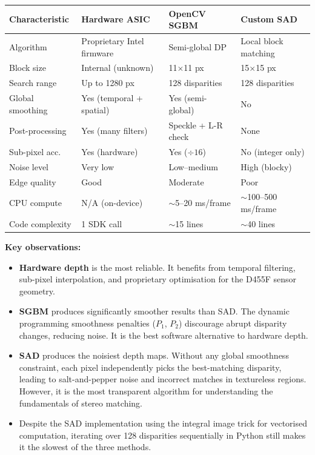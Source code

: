 \documentclass[12pt, a4paper]{article}
\begin{document}
\begin{center}
\begin{tabularx}{\linewidth}{lXXX}
  \toprule
  \textbf{Characteristic}   & \textbf{Hardware ASIC} & \textbf{OpenCV SGBM} & \textbf{Custom SAD} \\
  \midrule
  Algorithm       & Proprietary Intel firmware & Semi-global DP & Local block matching \\
  Block size      & Internal (unknown)  & 11$\times$11 px & 15$\times$15 px \\
  Search range    & Up to 1280 px       & 128 disparities & 128 disparities \\
  Global smoothing& Yes (temporal + spatial) & Yes (semi-global) & No \\
  Post-processing & Yes (many filters)  & Speckle + L-R check & None \\
  Sub-pixel acc.  & Yes (hardware)      & Yes ($\div 16$) & No (integer only) \\
  Noise level     & Very low            & Low--medium     & High (blocky) \\
  Edge quality    & Good                & Moderate        & Poor \\
  CPU compute     & N/A (on-device)     & $\sim$5--20 ms/frame & $\sim$100--500 ms/frame \\
  Code complexity & 1 SDK call          & $\sim$15 lines  & $\sim$40 lines \\
  \bottomrule
\end{tabularx}
\end{center}

\textbf{Key observations:}

\begin{itemize}
  \item \textbf{Hardware depth} is the most reliable. It benefits from temporal
        filtering, sub-pixel interpolation, and proprietary optimisation for
        the D455F sensor geometry.

  \item \textbf{SGBM} produces significantly smoother results than SAD. The
        dynamic programming smoothness penalties ($P_1$, $P_2$) discourage
        abrupt disparity changes, reducing noise. It is the best software
        alternative to hardware depth.

  \item \textbf{SAD} produces the noisiest depth maps. Without any global
        smoothness constraint, each pixel independently picks the best-matching
        disparity, leading to salt-and-pepper noise and incorrect matches in
        textureless regions. However, it is the most transparent algorithm for
        understanding the fundamentals of stereo matching.

  \item Despite the SAD implementation using the integral image trick for
        vectorised computation, iterating over 128 disparities sequentially
        in Python still makes it the slowest of the three methods.
\end{itemize}
\end{document}
